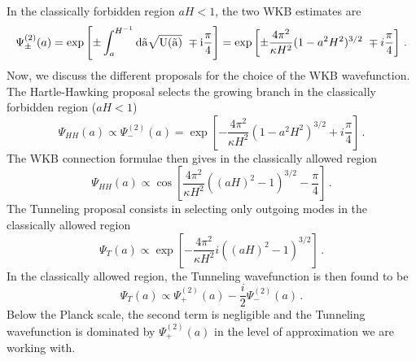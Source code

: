 \documentclass[a4paper,11pt]{article}
\begin{document}
In the classically forbidden region $aH<1$, the two WKB estimates are 
\begin{equation}
    \Psi^{(2)}_{\pm}(a) = \exp\left[\pm\int_{a}^{H^{-1}} \rm{d}\tilde{a}\sqrt{U(\tilde{a})}~ \mp i\frac{\pi}{4}\right] = \exp\left[\pm\frac{4\pi^2}{\kappa H^2}(1-a^2H^2)^{3/2}~ \mp i\frac{\pi}{4}\right]\,.
\end{equation}
Now, we discuss the different proposals for the choice of the WKB wavefunction. The Hartle-Hawking proposal selects the growing branch in the classically forbidden region ($aH<1$)
\begin{equation}
    \Psi_{HH}(a) \propto \Psi_-^{(2)}(a)=\exp\left[-\frac{4\pi^2}{\kappa H^2}(1-a^2H^2)^{3/2}+i\frac{\pi}{4}\right]\,.
\end{equation}
The WKB connection formulae then gives in the classically allowed region
\begin{equation}
     \Psi_{HH}(a)\propto\cos\left[\frac{4\pi^2}{\kappa H^2}\left((aH)^2-1\right)^{3/2}-\frac{\pi}{4}\right]\,.
\end{equation}
The Tunneling proposal consists in selecting only outgoing modes in the classically allowed region
\begin{equation}
    \Psi_{T}(a)  \propto \exp\left[-\frac{4\pi^2}{\kappa H^2}i\left((aH)^2-1\right)^{3/2}\right]\,.
\end{equation}
In the classically allowed region, the Tunneling wavefunction is then found to be 
\begin{equation}
    \Psi_{T}(a)  \propto \Psi_+^{(2)}(a)-\frac{i}{2}\Psi_-^{(2)}(a)\,.
\end{equation}
Below the Planck scale, the second term is negligible and the Tunneling wavefunction is dominated by $\Psi_+^{(2)}(a)$ in the level of approximation we are working with.
\end{document}
